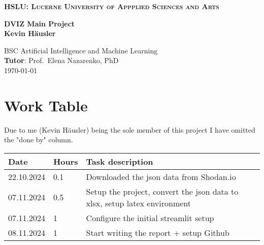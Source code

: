 \documentclass[11pt,a4paper]{article}
\newcommand{\school}{HSLU: Lucerne University of Appplied Sciences and Arts}
\newcommand{\degree}{BSC Artificial Intelligence and Machine Learning}
\newcommand{\projtitle}{DVIZ Main Project}
\newcommand{\projauthor}{Kevin Häusler}
\newcommand{\tutor}{Prof.\ Elena Nazarenko, PhD}
\begin{document}
\setcounter{page}{1}


\begin{titlepage}
\center

\vspace{-15mm}
{\large \textbf{\textsc{\school}}}\\

\vfill

{\Large \textbf{\projtitle}}\\[8mm]

{\Large \textbf{\projauthor}}\\

\vfill


\vfill

{\large \degree}\\[8mm]
{\large \textbf{Tutor}: \tutor}\\[8mm]

\today

\end{titlepage}


\renewcommand{\contentsname}{Table of Contents}

\tableofcontents
\newpage

\section{Work Table}

Due to me (Kevin Häusler) being the sole member of this project I have omitted the "done by" column.

\begin{table}[H]
\centering
\begin{tabular}{|l|l|l|}
\hline
\textbf{Date} & \textbf{Hours} & \textbf{Task description} \\ \hline
22.10.2024 &  0.1             &     Downloaded the json data from Shodan.io                       \\ \hline
 07.11.2024             & 0.5              &  Setup the project, convert the json data to xlsx, setup latex environment                         \\ \hline
 07.11.2024             &      1          &   Configure the initial streamlit setup                  \\ \hline
08.11.2024 & 1 & Start writing the report + setup Github \\ \hline
\end{tabular}
\end{table}
\end{document}
